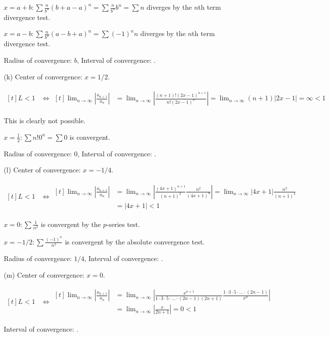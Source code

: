 \documentclass[preview, margin=0.6in]{standalone}
\begin{document}
\begin{itemize}
	$\displaystyle x=a+b: \sum \frac{n}{b^n}(b+a-a)^n=\sum \frac{n}{b^n}b^n=\sum n$ diverges by the $n$th term divergence test.

	$\displaystyle x=a-b: \sum \frac{n}{b^n}(a-b+a)^n=\sum (-1)^n n$ diverges by the $n$th term divergence test.

	Radius of convergence: $b$, Interval of convergence: .

\item[(k)]
	Center of convergence: $x=1/2$.

	$\begin{aligned}[t]
		L<1
		&\iff 
		\begin{aligned}[t]
			\lim_{n\to\infty}\left|\frac{a_{n+1}}{a_n}\right|
			&=\lim_{n\to\infty}\left|\frac{(n+1)!(2x-1)^{n+1}}{n!(2x-1)^n}\right|
			=\lim_{n\to\infty}(n+1)\left|2x-1\right|
			=\infty<1
		\end{aligned}
	\end{aligned}$

	This is clearly not possible.

	$\displaystyle x=\frac12: \sum n! 0^n = \sum 0$ is convergent.

	Radius of convergence: $0$, Interval of convergence: \boxed{[1/2,1/2]}.

\item[(l)]
	Center of convergence: $x=-1/4$.

	$\begin{aligned}[t]
		L<1
		&\iff 
		\begin{aligned}[t]
			\lim_{n\to\infty}\left|\frac{a_{n+1}}{a_n}\right|
			&=\lim_{n\to\infty}\left|\frac{(4x+1)^{n+1}}{(n+1)^2}\frac{n^2}{(4x+1)^n}\right|
			=\lim_{n\to\infty}\left|4x+1\right|\frac{n^2}{(n+1)^2} \\
			&=|4x+1|<1
		\end{aligned}
	\end{aligned}$

	$\displaystyle x=0: \sum \frac{1}{n^2}$ is convergent by the $p$-series test.

	$\displaystyle x=-1/2: \sum \frac{(-1)^n}{n^2}$ is convergent by the absolute convergence test.

	Radius of convergence: $1/4$, Interval of convergence: \boxed{[-1/2,0]}.

\item[(m)]
	Center of convergence: $x=0$.

	$\begin{aligned}[t]
		L<1
		&\iff 
		\begin{aligned}[t]
			\lim_{n\to\infty}\left|\frac{a_{n+1}}{a_n}\right|
			&=\lim_{n\to\infty}\left|\frac{x^{n+1}}{1\cdot3\cdot5\cdot\ldots\cdot(2n-1)(2n+1)}\frac{1\cdot3\cdot5\cdot\ldots\cdot(2n-1)}{x^n}\right| \\
			&=\lim_{n\to\infty}\left|\frac{x}{2n+1}\right|
			=0<1
		\end{aligned}
	\end{aligned}$

	Interval of convergence: \boxed{(-\infty,\infty)}.
\end{itemize}
\end{document}
